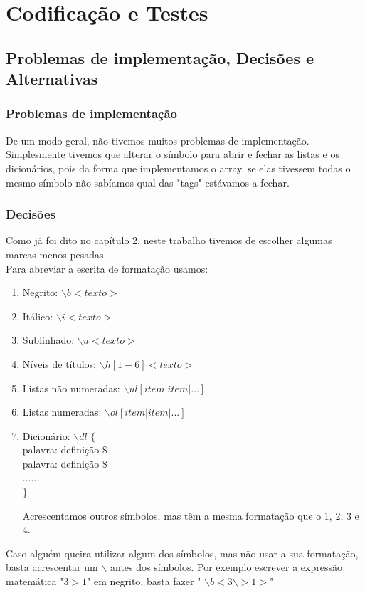 \documentclass{report}
\begin{document}
\chapter{Codificação e Testes}
\section{Problemas de implementação, Decisões e Alternativas}
\subsection{Problemas de implementação}

De um modo geral, não tivemos muitos problemas de implementação. Simplesmente tivemos que alterar o símbolo para abrir e fechar as listas e os dicionários, pois da forma que implementamos o array, se elas tivessem todas o mesmo símbolo não sabíamos qual das "tags" estávamos a fechar.    


\subsection{Decisões}
Como já foi dito no capítulo 2, neste trabalho tivemos de escolher algumas marcas menos pesadas.\\ 
Para abreviar a escrita de formatação usamos: 

\begin{enumerate}[1-] 

\item Negrito: $\backslash$$b$$<texto>$ 

\item Itálico: $\backslash$$i$$<texto>$ 

\item Sublinhado: $\backslash$$u$$<texto>$ 

\item Níveis de títulos: $\backslash$$h[1-6]$$<texto>$ 

\item Listas não numeradas: $\backslash$$ul$$[item | item|... ]$ 

\item Listas numeradas: $\backslash$$ol$$[item | item|... ]$ 

\item Dicionário: $\backslash$$dl$ $\{$ \\ 
palavra: definição $\$$\\ 
palavra: definição $\$$\\ 
......\\ 
$\}$

Acrescentamos outros símbolos, mas têm a mesma formatação que o 1, 2, 3 e 4.

\end{enumerate}
Caso alguém queira utilizar algum dos símbolos, mas não usar a sua formatação, basta acrescentar um $\backslash$ 
antes dos símbolos. Por exemplo escrever a expressão matemática "$3>1$" em negrito, basta fazer  " $\backslash$$b$$<3$$\backslash$$>1>$" 
\end{document}
